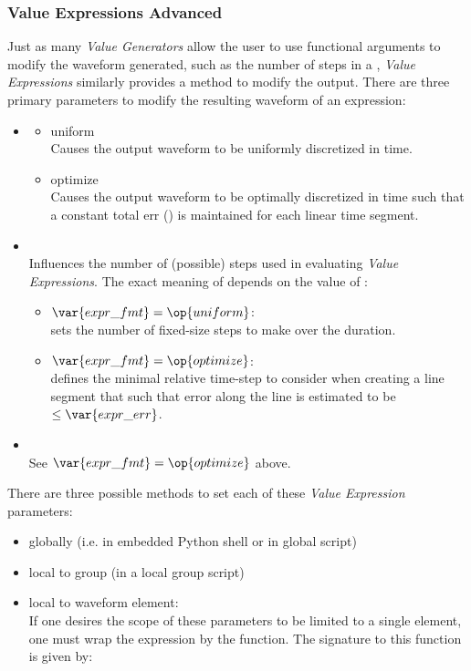\subsubsection{Value Expressions Advanced}
Just as many \textit{Value Generators} allow the user to use functional arguments to
modify the waveform generated, such as the number of steps in a ,
\textit{Value Expressions} similarly provides a method to modify the output.
%
There are three primary parameters to modify the resulting waveform of an
expression:
\begin{itemize}
  \item {}
    \begin{itemize}
    \item uniform\\
      Causes the output waveform to be uniformly discretized in time.
    \item optimize\\
      Causes the output waveform to be optimally discretized in time such that a
      constant total err () is maintained for each linear
      time segment.
    \end{itemize}
  \item {}\\
    Influences the number of (possible) steps used in evaluating \textit{Value
    Expressions}.  The exact meaning of  depends on the value of
    :
    \begin{itemize}
      \item $\var{expr\_fmt} = \op{uniform}$:\\
         sets the number of fixed-size steps to make over the duration.
      \item $\var{expr\_fmt} = \op{optimize}$:\\
         defines the minimal relative time-step to consider
        when creating a line segment that such that error along the line is
        estimated to be $\le \var{expr\_err}$.
    \end{itemize}
  \item {}\\
      See $\var{expr\_fmt} = \op{optimize}$ above.
\end{itemize}
%
There are three possible methods to set each of these \textit{Value Expression}
parameters:
\begin{itemize}
  \item globally (i.e. in embedded Python shell or in global script)
  \item local to group (in a local group script)
  \item local to waveform element:\\
    If one desires the scope of these parameters to be limited to a single
    element, one must wrap the expression by the  function.
    The signature to this function is given by:\\
\end{itemize}



